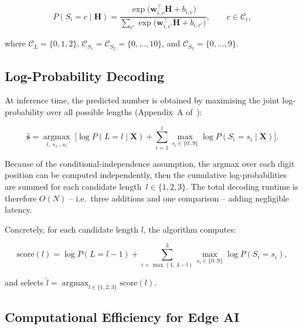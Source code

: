 \begin{equation}
\label{eq:head}
  P(S_i = c \mid \mathbf{H})
  = \frac{\exp\!\bigl(\mathbf{w}_{i,c}^{\top}\!\mathbf{H} + b_{i,c}\bigr)}
         {\displaystyle\sum_{c'} \exp\!\bigl(\mathbf{w}_{i,c'}^{\top}\!\mathbf{H}
         + b_{i,c'}\bigr)},
  \qquad c \in \mathcal{C}_i,
\end{equation}

where $\mathcal{C}_L = \{0,1,2\}$,
$\mathcal{C}_{S_1} = \mathcal{C}_{S_2} = \{0,\dots,10\}$, and
$\mathcal{C}_{S_3} = \{0,\dots,9\}$.

\subsection{Log-Probability Decoding}
\label{sec:decoding}

At inference time, the predicted number is obtained by maximising the
joint log-probability over all possible lengths
(Appendix~A of~\cite{goodfellow2014multidigitnumberrecognitionstreet}):

\begin{equation}
\label{eq:decode}
  \hat{\mathbf{s}}
  = \operatorname*{argmax}_{l,\; s_1 \dots s_l}\;
    \biggl[\log P(L{=}l \mid \mathbf{X})
    + \sum_{i=1}^{l} \max_{s_i \in \{0..9\}}
      \log P(S_i{=}s_i \mid \mathbf{X})\biggr].
\end{equation}

Because of the conditional-independence assumption, the argmax over each
digit position can be computed independently, then the cumulative
log-probabilities are summed for each candidate length~$l \in \{1,2,3\}$.
The total decoding runtime is therefore $O(N)$ -- i.e.\ three additions
and one comparison -- adding negligible latency.

Concretely, for each candidate length $l$, the algorithm computes:

\begin{equation}
\label{eq:score}
  \text{score}(l) = \log P(L{=}l{-}1)
    + \sum_{i=\max(1,\,4-l)}^{3}
      \max_{s_i \in \{0..9\}} \log P(S_i{=}s_i),
\end{equation}

and selects $\hat{l} = \operatorname{argmax}_{l \in \{1,2,3\}} \text{score}(l)$.

\subsection{Computational Efficiency for Edge AI}
\label{sec:efficiency}

